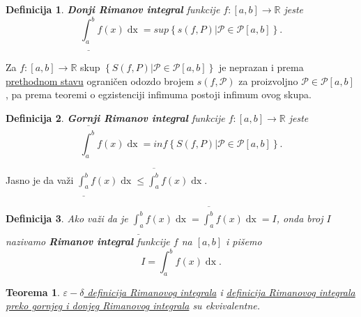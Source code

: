 \documentclass{article}
\newtheorem{definicija}{Definicija}[section]
\newtheorem{teorema}{Teorema}[section]
\DeclareMathOperator{\dx}{dx}
\begin{document}
\begin{defbox}
    \label{definicija_2.6}
    \begin{definicija}
        \textbf{Donji Rimanov integral} funkcije $f: \left[a,b\right]\longrightarrow\mathbb{R}$ jeste
        $$\underline{\int_{a}^{b}}f\left(x\right)\dx=sup\left\{s\left(f,P\right)\big|\mathcal{P}\in\mathcal{P}\left[a,b\right]\right\}.$$
    \end{definicija}
\end{defbox}

Za $f: \left[a,b\right]\longrightarrow\mathbb{R}$ skup $\left\{S\left(f,P\right)\big|\mathcal{P}\in\mathcal{P}\left[a,b\right]\right\}$
je neprazan i prema \hyperref[stav_2.2]{prethodnom stavu} ograničen odozdo brojem $s\left(f,\mathcal{P}\right)$ za proizvoljno $\mathcal{P}\in\mathcal{P}\left[a,b\right]$,
pa prema teoremi o egzistenciji infimuma postoji infimum ovog
skupa.

\begin{defbox}
    \label{definicija_2.7}
    \begin{definicija}
        \textbf{Gornji Rimanov integral} funkcije $f: \left[a,b\right]\longrightarrow\mathbb{R}$ jeste
        $$\overline{\int_{a}^{b}}f\left(x\right)\dx=inf\left\{S\left(f,P\right)\big|\mathcal{P}\in\mathcal{P}\left[a,b\right]\right\}.$$
    \end{definicija}
\end{defbox}

Jasno je da važi $\displaystyle\underline{\int_{a}^{b}}f\left(x\right)\dx\leq\overline{\int_{a}^{b}}f\left(x\right)\dx$.

\begin{defbox}
    \label{definicija_2.8}
    \begin{definicija}
        Ako važi da je $\displaystyle\underline{\int_{a}^{b}}f\left(x\right)\dx=\overline{\int_{a}^{b}}f\left(x\right)\dx=I$,
        onda broj $I$ nazivamo \textbf{Rimanov integral} funkcije $f$ na $\left[a,b\right]$ i pišemo
        $$I=\int_{a}^{b}f\left(x\right)\dx.$$
    \end{definicija}
\end{defbox}

\begin{teoremabox}
    \label{teorema_2.2}
    \begin{teorema}
        \hyperref[definicija_2.3]{$\varepsilon-\delta$ definicija Rimanovog integrala} i \hyperref[definicija_2.8]{definicija Rimanovog integrala preko gornjeg i donjeg Rimanovog integrala}
        su ekvivalentne.
    \end{teorema}
\end{teoremabox}
\end{document}
